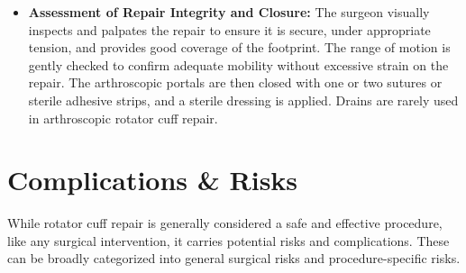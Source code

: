 \begin{itemize}
  \item \textbf{Assessment of Repair Integrity and Closure:} The surgeon visually inspects and palpates the repair to ensure it is secure, under appropriate tension, and provides good coverage of the footprint. The range of motion is gently checked to confirm adequate mobility without excessive strain on the repair. The arthroscopic portals are then closed with one or two sutures or sterile adhesive strips, and a sterile dressing is applied. Drains are rarely used in arthroscopic rotator cuff repair.
\end{itemize}

\section*{Complications \& Risks}
While rotator cuff repair is generally considered a safe and effective procedure, like any surgical intervention, it carries potential risks and complications. These can be broadly categorized into general surgical risks and procedure-specific risks.

